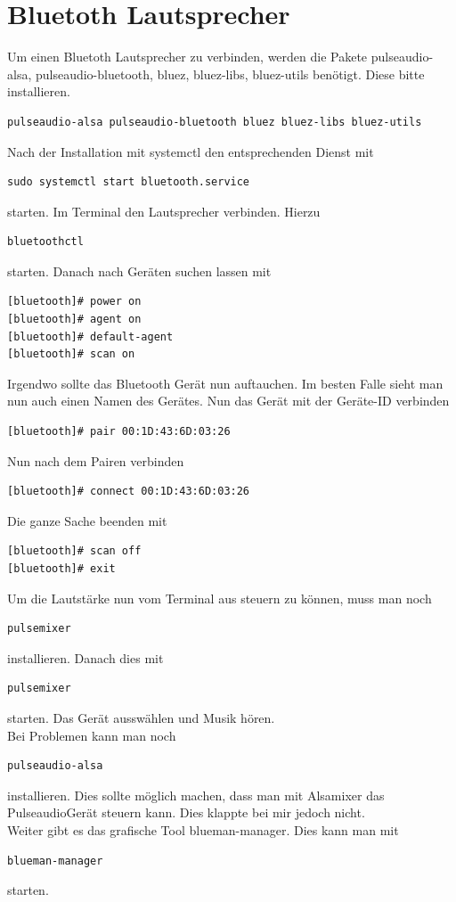 \documentclass[11pt,fleqn]{book} %
\numberwithin{equation}{section} %
\numberwithin{figure}{section} %
\numberwithin{table}{section} %
\begin{document}
\chapter{Bluetoth Lautsprecher}
Um einen Bluetoth Lautsprecher zu verbinden, werden die Pakete pulseaudio-alsa, pulseaudio-bluetooth, bluez, bluez-libs, bluez-utils benötigt. Diese bitte installieren. 
\begin{lstlisting}
pulseaudio-alsa pulseaudio-bluetooth bluez bluez-libs bluez-utils
\end{lstlisting}
Nach der Installation mit systemctl den entsprechenden Dienst mit
\begin{lstlisting}
sudo systemctl start bluetooth.service
\end{lstlisting}
starten. Im Terminal den Lautsprecher verbinden. Hierzu
\begin{lstlisting}
bluetoothctl
\end{lstlisting}
starten. Danach nach Geräten suchen lassen mit
\begin{lstlisting}
[bluetooth]# power on
[bluetooth]# agent on
[bluetooth]# default-agent
[bluetooth]# scan on
\end{lstlisting}
Irgendwo sollte das Bluetooth Gerät nun auftauchen. Im besten Falle sieht man nun auch einen Namen des Gerätes. Nun das Gerät mit der Geräte-ID verbinden
\begin{lstlisting}
[bluetooth]# pair 00:1D:43:6D:03:26
\end{lstlisting}
Nun nach dem Pairen verbinden
\begin{lstlisting}
[bluetooth]# connect 00:1D:43:6D:03:26
\end{lstlisting}
Die ganze Sache beenden mit
\begin{lstlisting}
[bluetooth]# scan off
[bluetooth]# exit
\end{lstlisting}
Um die Lautstärke nun vom Terminal aus steuern zu können, muss man noch
\begin{lstlisting}
pulsemixer
\end{lstlisting}
installieren. Danach dies mit 
\begin{lstlisting}
pulsemixer
\end{lstlisting}
starten. Das Gerät ausswählen und Musik hören.\\
Bei Problemen kann man noch
\begin{lstlisting}
pulseaudio-alsa
\end{lstlisting}
installieren. Dies sollte möglich machen, dass man mit Alsamixer das PulseaudioGerät steuern kann. Dies klappte bei mir jedoch nicht.\\
Weiter gibt es das grafische Tool blueman-manager. Dies kann man mit
\begin{lstlisting}
blueman-manager
\end{lstlisting}
starten.
\end{document}
